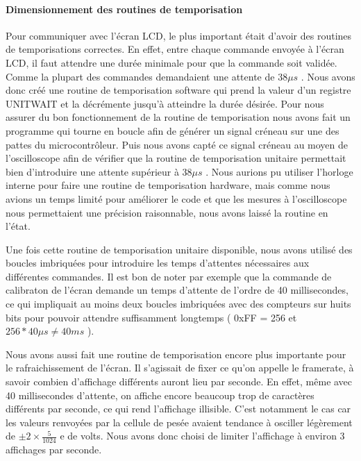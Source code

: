 \documentclass[a4paper,11pt,titlepage]{article}
\begin{document}
\paragraph{Dimensionnement des routines de temporisation}
Pour communiquer avec l'écran LCD, le plus important était d'avoir des routines de temporisations correctes. En effet, entre chaque commande envoyée à l'écran LCD, il faut attendre une durée minimale pour que la commande soit validée. Comme la plupart des commandes demandaient une attente de $ 38 \mu s $ . Nous avons donc créé une routine de temporisation software qui prend la valeur d'un registre UNIT\textunderscore WAIT et la décrémente jusqu'à atteindre la durée désirée. Pour nous assurer du bon fonctionnement de la routine de temporisation nous avons fait un programme qui tourne en boucle afin de générer un signal créneau sur une des pattes du microcontrôleur. Puis nous avons capté ce signal créneau au moyen de l'oscilloscope afin de vérifier que la routine de temporisation unitaire permettait bien d'introduire une attente supérieur à $ 38 \mu s $ .
Nous aurions pu utiliser l'horloge interne pour faire une routine de temporisation hardware, mais comme nous avions un temps limité pour améliorer le code et que les mesures à l'oscilloscope nous permettaient une précision raisonnable, nous avons laissé la routine en l'état.

Une fois cette routine de temporisation unitaire disponible, nous avons utilisé des boucles imbriquées pour introduire les temps d'attentes nécessaires aux différentes commandes. Il est bon de noter par exemple que la commande de calibraton de l'écran demande un temps d'attente de l'ordre de 40 millisecondes, ce qui impliquait au moins deux boucles imbriquées avec des compteurs sur huits bits pour pouvoir attendre suffisamment longtemps ( 0xFF = 256 et $256 * 40 \mu s  \neq 40 ms$ ).

Nous avons aussi fait une routine de temporisation encore plus importante pour le rafraichissement de l'écran. Il s'agissait de fixer ce qu'on appelle le framerate, à savoir combien d'affichage différents auront lieu par seconde. En effet, même avec 40 millisecondes d'attente, on affiche encore beaucoup trop de caractères différents par seconde, ce qui rend l'affichage illisible. C'est notamment le cas car les valeurs renvoyées par la cellule de pesée avaient tendance à osciller légèrement de $\pm 2 \times \frac{5}{1024}$ e de volts. Nous avons donc choisi de limiter l'affichage à environ 3 affichages par seconde.
\end{document}
